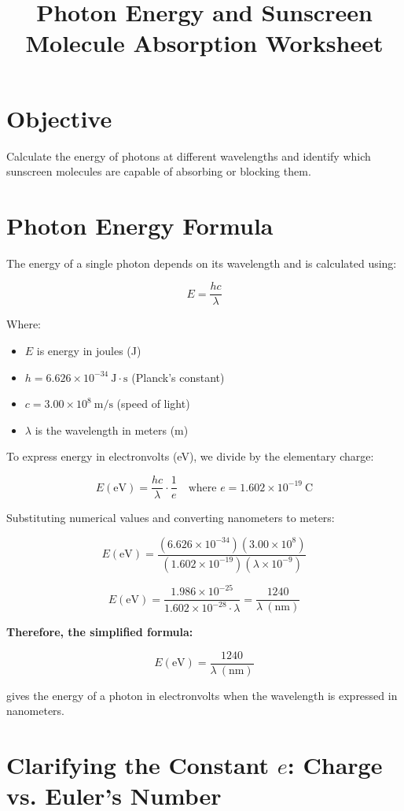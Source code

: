 \documentclass[12pt]{article}
\title{\bfseries Photon Energy and Sunscreen Molecule Absorption Worksheet}
\author{}
\date{}
\begin{document}
\maketitle

\section*{Objective}
Calculate the energy of photons at different wavelengths and identify which sunscreen molecules are capable of absorbing or blocking them.

\section*{Photon Energy Formula}

The energy of a single photon depends on its wavelength and is calculated using:

\[
E = \frac{hc}{\lambda}
\]

Where:
\begin{itemize}
    \item $E$ is energy in joules (J)
    \item $h = 6.626 \times 10^{-34}\ \text{J}\cdot\text{s}$ (Planck's constant)
    \item $c = 3.00 \times 10^8\ \text{m/s}$ (speed of light)
    \item $\lambda$ is the wavelength in meters (m)
\end{itemize}

To express energy in electronvolts (eV), we divide by the elementary charge:

\[
E(\text{eV}) = \frac{hc}{\lambda} \cdot \frac{1}{e}
\quad \text{where } e = 1.602 \times 10^{-19}\ \text{C}
\]

Substituting numerical values and converting nanometers to meters:

\[
E(\text{eV}) = \frac{(6.626 \times 10^{-34})(3.00 \times 10^8)}{(1.602 \times 10^{-19})(\lambda \times 10^{-9})}
\]

\[
E(\text{eV}) = \frac{1.986 \times 10^{-25}}{1.602 \times 10^{-28} \cdot \lambda}
= \frac{1240}{\lambda\ (\text{nm})}
\]

\noindent
\textbf{Therefore, the simplified formula:}

\[
E(\text{eV}) = \frac{1240}{\lambda\ (\text{nm})}
\]

gives the energy of a photon in electronvolts when the wavelength is expressed in nanometers.

\section*{Clarifying the Constant \( e \): Charge vs. Euler’s Number}
\end{document}

